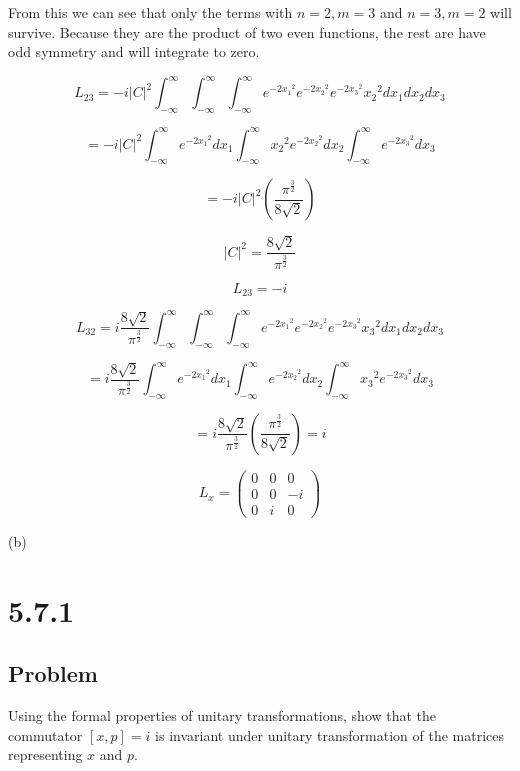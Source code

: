 \documentclass[12pt]{article}
\begin{document}
From this we can see that only the terms with \(n = 2, m = 3\) and \(n = 3, m = 2\) will survive.
Because they are the product of two even functions, the rest are have odd symmetry and will integrate to zero.

\[
    L_{23} = -i{\left\lvert C\right\rvert}^2
    \int_{-\infty }^{\infty}
    \int_{-\infty}^{\infty}
    \int_{-\infty}^{\infty}
    e^{-2{x_1}^2}e^{-2{x_2}^2}e^{-2{x_3}^2}
    {x_2}^2  d{x_1} d{x_2} d{x_3}
\]

\[
    = -i{\left\lvert C\right\rvert}^2
    \int_{-\infty }^{\infty}e^{-2{x_1}^2}d{x_1}
    \int_{-\infty}^{\infty}{x_2}^2e^{-2{x_2}^2}d{x_2}
    \int_{-\infty}^{\infty}e^{-2{x_3}^2}d{x_3}
\]

\[
    = -i{\left\lvert C\right\rvert}^2
    \left(\frac{\pi^{\frac{3}{2}}}{8\sqrt{2}}\right)
\]

\[
    {\left\lvert C\right\rvert}^2 = \frac{8\sqrt{2}}{\pi^{\frac{3}{2}}}
\]

\[
    L_{23} = -i
\]

\[
    L_{32} = i \frac{8\sqrt{2}}{\pi^{\frac{3}{2}}}
    \int_{-\infty }^{\infty}
    \int_{-\infty}^{\infty}
    \int_{-\infty}^{\infty}
    e^{-2{x_1}^2}e^{-2{x_2}^2}e^{-2{x_3}^2}
    {x_3}^2  d{x_1} d{x_2} d{x_3}
\]

\[
    = i \frac{8\sqrt{2}}{\pi^{\frac{3}{2}}}
    \int_{-\infty }^{\infty}e^{-2{x_1}^2}d{x_1}
    \int_{-\infty}^{\infty}e^{-2{x_2}^2}d{x_2}
    \int_{-\infty}^{\infty}{x_3}^2e^{-2{x_3}^2}d{x_3}
\]

\[
    = i \frac{8\sqrt{2}}{\pi^{\frac{3}{2}}}
    \left(\frac{\pi^{\frac{3}{2}}}{8\sqrt{2}}\right)
    = i
\]

\[
    L_x =
    \begin{pmatrix}
        0 & 0 & 0  \\
        0 & 0 & -i \\
        0 & i & 0
    \end{pmatrix}
\]

(b)



\newpage
\section{5.7.1}

\subsection{Problem}

Using the formal properties of unitary transformations, show that the commutator \([x, p]=i\) is invariant under unitary transformation of the matrices representing \(x\) and \(p\).
\end{document}
